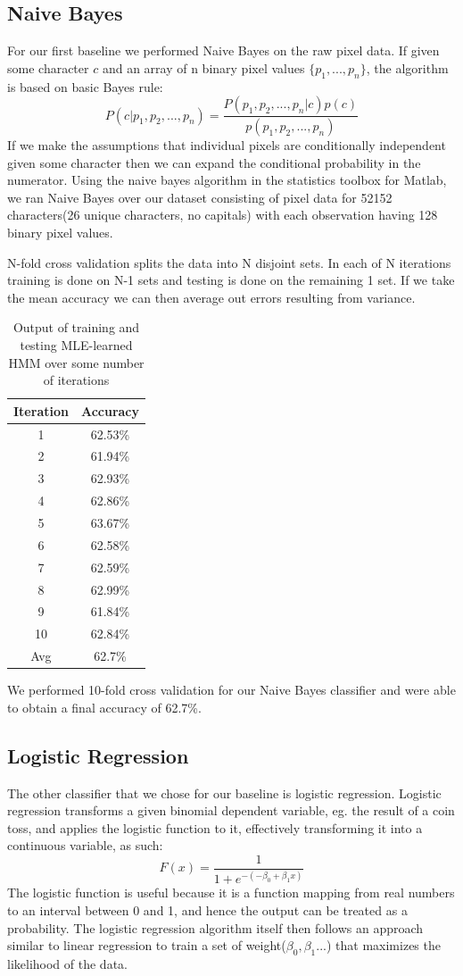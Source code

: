 \documentclass{article} %
\begin{document}
\subsection{Naive Bayes}
For our first baseline we performed Naive Bayes on the raw pixel data.
If given some character $c$ and an array of n binary pixel values $\{p_1, ..., p_n\}$, the algorithm is based on basic Bayes rule:
$$P(c|p_1, p_2, ... , p_n) = \frac{P(p_1, p_2, ... , p_n|c)p(c)}{p(p_1, p_2, ... , p_n)}$$
If we make the assumptions that individual pixels are conditionally independent given some character then we can expand the conditional probability in the numerator. Using the naive bayes algorithm in the statistics toolbox for Matlab, we ran Naive Bayes over our dataset consisting of pixel data for 52152 characters(26 unique characters, no capitals) with each observation having 128 binary pixel values.

N-fold cross validation splits the data into N disjoint sets. In each of N iterations training is done on N-1 sets and testing is done on the remaining 1 set. If we take the mean accuracy we can then average out errors resulting from variance.


\begin{table}[h]
\centering
\begin{tabular}{|c|c|}
\hline
Iteration & Accuracy \\
\hline
1 & 62.53\% \\
2 & 61.94\% \\
3 & 62.93\% \\
4 & 62.86\% \\
5 & 63.67\% \\
6 & 62.58\% \\
7 & 62.59\% \\
8 & 62.99\% \\
9 & 61.84\% \\
10 & 62.84\% \\
\hline
Avg & 62.7\% \\ 
\hline
\end{tabular}
\caption{Output of training and testing MLE-learned HMM over some number of iterations}
\label{tab:mid-logr-results}
\end{table}

We performed 10-fold cross validation for our Naive Bayes classifier and were able to obtain a final accuracy of 62.7\%.

\subsection{Logistic Regression}
The other classifier that we chose for our baseline is logistic regression.
Logistic regression transforms a given binomial dependent variable, eg. the result of a coin toss, and applies the logistic function to it, effectively transforming it into a continuous variable, as such:
$$F(x) = \frac{1}{1+e^{-(-\beta_0 + \beta_1x)}}$$
The logistic function is useful because it is a function mapping from real numbers to an interval between 0 and 1, and hence the output can be treated as a probability. The logistic regression algorithm itself then follows an approach similar to linear regression to train a set of weight($\beta_0, \beta_1...$) that maximizes the likelihood of the data.
\end{document}
